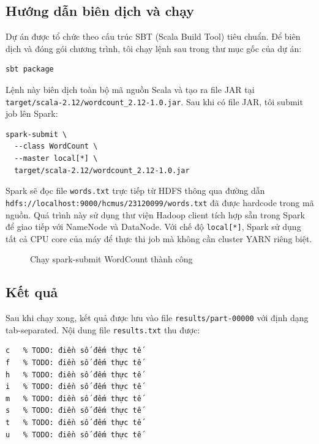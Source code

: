 \documentclass[12pt,a4paper]{article}
\begin{document}
\subsection{Hướng dẫn biên dịch và chạy}

Dự án được tổ chức theo cấu trúc SBT (Scala Build Tool) tiêu chuẩn. Để biên dịch
và đóng gói chương trình, tôi chạy lệnh sau trong thư mục gốc của dự án:

\begin{verbatim}
sbt package
\end{verbatim}

Lệnh này biên dịch toàn bộ mã nguồn Scala và tạo ra file JAR tại
\texttt{target/scala-2.12/wordcount\_2.12-1.0.jar}. Sau khi có file JAR, tôi submit
job lên Spark:

\begin{verbatim}
spark-submit \
  --class WordCount \
  --master local[*] \
  target/scala-2.12/wordcount_2.12-1.0.jar
\end{verbatim}

Spark sẽ đọc file \texttt{words.txt} trực tiếp từ HDFS thông qua đường dẫn
\texttt{hdfs://localhost:9000/hcmus/23120099/words.txt} đã được hardcode trong mã
nguồn. Quá trình này sử dụng thư viện Hadoop client tích hợp sẵn trong Spark để
giao tiếp với NameNode và DataNode. Với chế độ \texttt{local[*]}, Spark sử dụng
tất cả CPU core của máy để thực thi job mà không cần cluster YARN riêng biệt.

\begin{figure}[H]
  \centering
  \caption{Chạy spark-submit WordCount thành công}
  \label{fig:spark-submit}
\end{figure}

\subsection{Kết quả}

Sau khi chạy xong, kết quả được lưu vào file \texttt{results/part-00000} với định
dạng tab-separated. Nội dung file \texttt{results.txt} thu được:

\begin{verbatim}
c	% TODO: điền số đếm thực tế
f	% TODO: điền số đếm thực tế
h	% TODO: điền số đếm thực tế
i	% TODO: điền số đếm thực tế
m	% TODO: điền số đếm thực tế
s	% TODO: điền số đếm thực tế
t	% TODO: điền số đếm thực tế
u	% TODO: điền số đếm thực tế
\end{verbatim}
\end{document}
